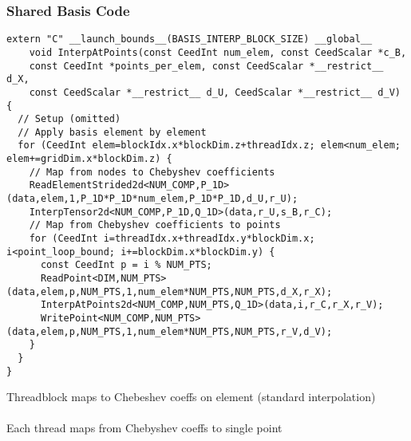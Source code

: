 \documentclass{beamer}
\begin{document}
\begin{frame}[fragile]
\begin{center}
\frametitle{Shared Basis Code}

{\tiny
\begin{lstlisting}[style=boxedC]
extern "C" __launch_bounds__(BASIS_INTERP_BLOCK_SIZE) __global__
    void InterpAtPoints(const CeedInt num_elem, const CeedScalar *c_B,
    const CeedInt *points_per_elem, const CeedScalar *__restrict__ d_X,
    const CeedScalar *__restrict__ d_U, CeedScalar *__restrict__ d_V) {
  // Setup (omitted)
  // Apply basis element by element
  for (CeedInt elem=blockIdx.x*blockDim.z+threadIdx.z; elem<num_elem; elem+=gridDim.x*blockDim.z) {
    // Map from nodes to Chebyshev coefficients
    ReadElementStrided2d<NUM_COMP,P_1D>(data,elem,1,P_1D*P_1D*num_elem,P_1D*P_1D,d_U,r_U);
    InterpTensor2d<NUM_COMP,P_1D,Q_1D>(data,r_U,s_B,r_C);
    // Map from Chebyshev coefficients to points
    for (CeedInt i=threadIdx.x+threadIdx.y*blockDim.x; i<point_loop_bound; i+=blockDim.x*blockDim.y) {
      const CeedInt p = i % NUM_PTS;
      ReadPoint<DIM,NUM_PTS>(data,elem,p,NUM_PTS,1,num_elem*NUM_PTS,NUM_PTS,d_X,r_X);
      InterpAtPoints2d<NUM_COMP,NUM_PTS,Q_1D>(data,i,r_C,r_X,r_V);
      WritePoint<NUM_COMP,NUM_PTS>(data,elem,p,NUM_PTS,1,num_elem*NUM_PTS,NUM_PTS,r_V,d_V);
    }
  }
}
\end{lstlisting}
}

Threadblock maps to Chebeshev coeffs on element (standard interpolation)\\

~\\

Each thread maps from Chebyshev coeffs to single point\\

\end{center}
\end{frame}

\end{document}
